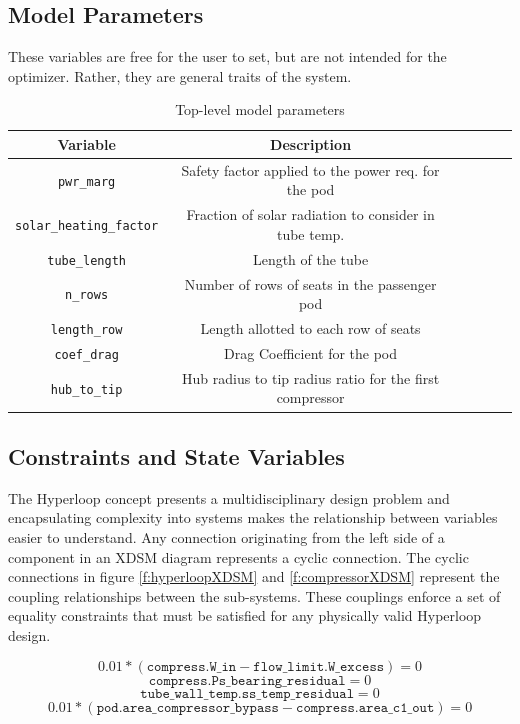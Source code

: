 \documentclass[heading.tex]{subfiles}
\begin{document}
\subsection{Model Parameters}
These variables are free for the user to set, but are not intended for the optimizer. Rather, they are general traits of the system.

\begin{table} [H]
\centering
\begin{tabular}{|c|c|c|c|c|c|}
\hline 
Variable & Description  \\ 
\hline 
\texttt{pwr\_marg} & Safety factor applied to the power req. for the pod \\ 
\hline 
\texttt{solar\_heating\_factor} & Fraction of solar radiation to consider in tube temp.\\ 
\hline 
\texttt{tube\_length} & Length of the tube  \\ 
\hline 
\texttt{n\_rows} & Number of rows of seats in the passenger pod  \\ 
\hline 
\texttt{length\_row} & Length allotted to each row of seats  \\ 
\hline 
\texttt{coef\_drag} & Drag Coefficient for the pod  \\ 
\hline 
\texttt{hub\_to\_tip} & Hub radius to tip radius ratio for the first compressor \\ 
\hline 
\end{tabular} 
 \caption[Model Parameters]{Top-level model parameters}
\end{table}

\subsection{Constraints and State Variables}

The Hyperloop concept presents a multidisciplinary design problem and encapsulating complexity into systems makes the relationship
between variables easier to understand.  Any connection originating from the left side of a component in an XDSM diagram represents a
cyclic connection. The cyclic connections in figure \ref{f:hyperloopXDSM}  and \ref{f:compressorXDSM} represent the coupling relationships
between the sub-systems. These couplings enforce a set of equality constraints that must be satisfied for any physically valid Hyperloop design. 

\begin{equation} \label{eq:flow}
	0.01*(\texttt{compress.W\_in} - \texttt{flow\_limit.W\_excess}) = 0
\end{equation}
\begin{equation} \label{eq:bearing}
	\texttt{compress.Ps\_bearing\_residual} = 0
\end{equation}
\begin{equation} \label{eq:temp}
	\texttt{tube\_wall\_temp.ss\_temp\_residual} = 0
\end{equation}
\begin{equation} \label{eq:area}
	0.01*(\texttt{pod.area\_compressor\_bypass} - \texttt{compress.area\_c1\_out}) = 0
\end{equation}
\end{document}

